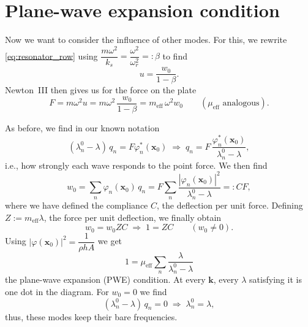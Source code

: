 \section{Plane-wave expansion condition}
\label{sec:pwe_condition}

Now we want to consider the influence of other modes. For this, we rewrite
\eqref{eq:resonator_row} using
$\dfrac{m\omega^2}{k_s} = \dfrac{\omega^2}{\omega_r^2} =: \beta$ to find
\begin{equation}
  u = \frac{w_0}{1 - \beta} .
\end{equation}
Newton~III then gives us for the force on the
plate
\begin{equation}
  F = m\omega^2 u = m\omega^2\,\frac{w_0}{1-\beta} = m_\mathrm{eff}\,\omega^2 w_0
  \qquad (\mu_\mathrm{eff}\text{ analogous}) .
\end{equation}

As before, we find in our known notation
\begin{equation}
  (\lambda_n^0 - \lambda)\, q_n = F\varphi_n^*(\mathbf{x}_0)
  \;\Rightarrow\;
  q_n = F\,\frac{\varphi_n^*(\mathbf{x}_0)}{\lambda_n^0 - \lambda} ,
\end{equation}
i.e., how strongly each wave responds to the point force. We then find
\begin{equation}
  w_0 = \sum_n \varphi_n(\mathbf{x}_0)\, q_n
  = F \sum_n \frac{|\varphi_n(\mathbf{x}_0)|^2}{\lambda_n^0 - \lambda}
  =: C F ,
\end{equation}
where we have defined the compliance $C$, the
deflection per unit force.
Defining $Z := m_\mathrm{eff}\lambda$, the force per unit deflection, we finally
obtain
\begin{equation}
  w_0 = w_0 Z C \;\Rightarrow\; \boxed{1 = ZC} \qquad (w_0 \neq 0) .
  \label{eq:zc_condition}
\end{equation}
Using $|\varphi(\mathbf{x}_0)|^2 = \dfrac{1}{\rho h A}$ we get
\begin{equation}
  \boxed{\;1 = \mu_\mathrm{eff}\sum_n \frac{\lambda}{\lambda_n^0 - \lambda}\;}
  \label{eq:pwe_condition}
\end{equation}
the plane-wave expansion (PWE) condition. At every $\mathbf{k}$, every
$\lambda$ satisfying it is one dot in the diagram. For $w_0 = 0$ we find
\begin{equation}
  (\lambda_n^0 - \lambda)\, q_n = 0 \;\Rightarrow\; \lambda_n^0 = \lambda ,
\end{equation}
thus, these modes keep their bare frequencies.

